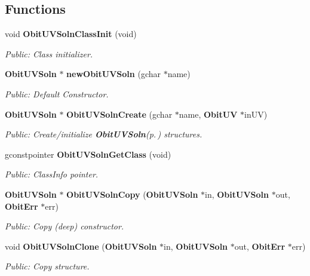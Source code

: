 \subsection*{Functions}
\begin{CompactItemize}
\item 
void {\bf Obit\-UVSoln\-Class\-Init} (void)
\begin{CompactList}\small\item\em Public: Class initializer. \item\end{CompactList}\item 
{\bf Obit\-UVSoln} $\ast$ {\bf new\-Obit\-UVSoln} (gchar $\ast$name)
\begin{CompactList}\small\item\em Public: Default Constructor. \item\end{CompactList}\item 
{\bf Obit\-UVSoln} $\ast$ {\bf Obit\-UVSoln\-Create} (gchar $\ast$name, {\bf Obit\-UV} $\ast$in\-UV)
\begin{CompactList}\small\item\em Public: Create/initialize {\bf Obit\-UVSoln}{\rm (p.\,\pageref{structObitUVSoln})} structures. \item\end{CompactList}\item 
gconstpointer {\bf Obit\-UVSoln\-Get\-Class} (void)
\begin{CompactList}\small\item\em Public: Class\-Info pointer. \item\end{CompactList}\item 
{\bf Obit\-UVSoln} $\ast$ {\bf Obit\-UVSoln\-Copy} ({\bf Obit\-UVSoln} $\ast$in, {\bf Obit\-UVSoln} $\ast$out, {\bf Obit\-Err} $\ast$err)
\begin{CompactList}\small\item\em Public: Copy (deep) constructor. \item\end{CompactList}\item 
void {\bf Obit\-UVSoln\-Clone} ({\bf Obit\-UVSoln} $\ast$in, {\bf Obit\-UVSoln} $\ast$out, {\bf Obit\-Err} $\ast$err)
\begin{CompactList}\small\item\em Public: Copy structure. \item\end{CompactList}\item 

\end{CompactItemize}
